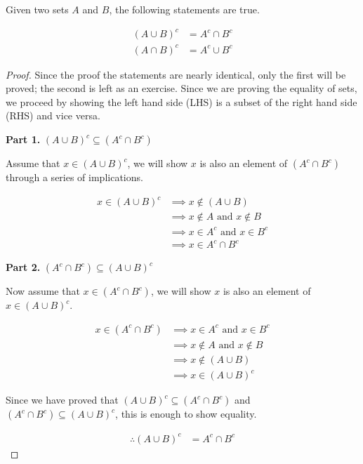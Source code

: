 \documentclass{report}
\newcommand{\header}[2]{\begin{flushright} \textbf{#1} #2 \end{flushright}}
\begin{document}
\begin{theorem}
	Given two sets $A$ and $B$, the following statements are true.
	
	\begin{align}
		(A \cup B)^c &= A^c \cap B^c \\
		(A \cap B)^c &= A^c \cup B^c
	\end{align}
\end{theorem}

\begin{proof}
	Since the proof the statements are nearly identical, only the first will be proved; the second is left as an exercise. Since we are proving the equality of sets, we proceed by showing the left hand side (LHS) is a subset of the right hand side (RHS) and vice versa.
	
	\header{Part 1.}{$(A \cup B)^c \subseteq (A^c \cap B^c)$}
	
	Assume that $x \in (A \cup B)^c$, we will show $x$ is also an element of $(A^c \cap B^c)$ through a series of implications.
	
	\begin{align*}
		x \in (A \cup B)^c &\implies x \notin (A \cup B) \\
		&\implies x \notin A \text{ and } x \notin B \\
		&\implies x \in A^c \text{ and } x \in B^c \\
		&\implies x \in A^c \cap B^c
	\end{align*}
		
	\header{Part 2.}{$(A^c \cap B^c) \subseteq (A \cup B)^c$}
	
	Now assume that $x \in (A^c \cap B^c)$, we will show $x$ is also an element of $x \in (A \cup B)^c$.
	
	\begin{align*}
		x \in (A^c \cap B^c) &\implies x \in A^c \text{ and } x \in B^c \\
		&\implies x \notin A \text{ and } x \notin B \\
		&\implies x \notin (A \cup B) \\
		&\implies x \in (A \cup B)^c
	\end{align*}
	
	Since we have proved that $(A \cup B)^c \subseteq (A^c \cap B^c)$ and $(A^c \cap B^c) \subseteq (A \cup B)^c$, this is enough to show equality.
	
	\begin{align*}
		\therefore (A \cup B)^c &= A^c \cap B^c
	\end{align*}
\end{proof}
\vspace{\baselineskip}
\end{document}
